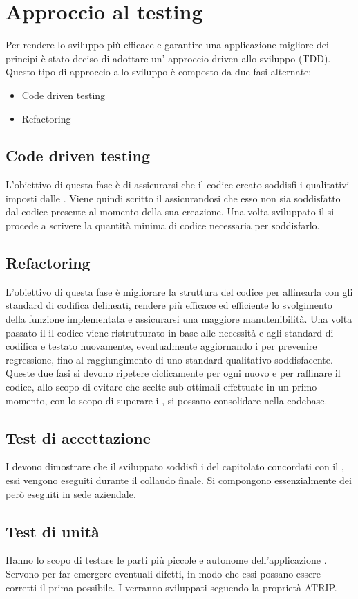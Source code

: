\section{Approccio al testing}
Per rendere lo sviluppo più efficace e garantire una applicazione migliore dei principi  è stato deciso di adottare un' approccio  driven allo sviluppo (TDD). \\
Questo tipo di approccio allo sviluppo è composto da due fasi alternate:
\begin{itemize}
\item Code driven testing
\item Refactoring
\end{itemize}
\subsection{Code driven testing}
L'obiettivo di questa fase è di assicurarsi che il codice creato soddisfi i  qualitativi imposti dalle . Viene quindi scritto il  assicurandosi che esso non sia soddisfatto dal codice presente al momento della sua creazione. Una volta sviluppato il  si procede a scrivere la quantità minima di codice necessaria per soddisfarlo.
\subsection{Refactoring}
L'obiettivo di questa fase è migliorare la struttura del codice per allinearla con gli standard di codifica delineati, rendere più efficace ed efficiente lo svolgimento della funzione implementata e assicurarsi una maggiore manutenibilità. Una volta passato il  il codice viene ristrutturato in base alle necessità e agli standard di codifica e testato nuovamente, eventualmente aggiornando i  per prevenire regressione, fino al raggiungimento di uno standard qualitativo soddisfacente. \newline{}
\newline{}
Queste due fasi si devono ripetere ciclicamente per ogni nuovo  e per raffinare il codice, allo scopo di evitare che scelte sub ottimali effettuate in un primo momento, con lo scopo di superare i , si possano consolidare nella codebase.


\subsection{Test di accettazione}
I  devono dimostrare che il  sviluppato soddisfi i  del capitolato concordati con il , essi vengono eseguiti durante il collaudo finale.
Si compongono essenzialmente dei  però eseguiti in sede aziendale.

\subsection{Test di unità}
Hanno lo scopo di testare le parti più piccole e autonome dell'applicazione . Servono per far emergere eventuali difetti, in modo che essi possano essere corretti il prima possibile.
I  verranno sviluppati seguendo la proprietà ATRIP.